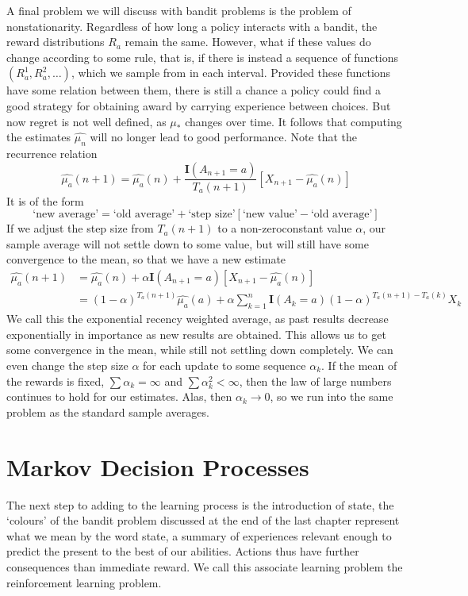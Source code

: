 A final problem we will discuss with bandit problems is the problem of nonstationarity. Regardless of how long a policy interacts with a bandit, the reward distributions $R_a$ remain the same. However, what if these values do change according to some rule, that is, if there is instead a sequence of functions $(R^1_a, R^2_a, \dots)$, which we sample from in each interval. Provided these functions have some relation between them, there is still a chance a policy could find a good strategy for obtaining award by carrying experience between choices. But now regret is not well defined, as $\mu_*$ changes over time. It follows that computing the estimates $\widehat{\mu_n}$ will no longer lead to good performance. Note that the recurrence relation
%
\[ \widehat{\mu_a}(n+1) = \widehat{\mu_a}(n) + \frac{\mathbf{I}(A_{n+1} = a)}{T_a(n+1)} [X_{n+1} - \widehat{\mu_a}(n)] \]
%
It is of the form
%
\[ \text{`new average'} = \text{`old average'} + \text{`step size'}[\text{`new value'} - \text{`old average'}] \]
%
If we adjust the step size from $T_a(n+1)$ to a non-zeroconstant value $\alpha$, our sample average will not settle down to some value, but will still have some convergence to the mean, so that we have a new estimate
%
\begin{align*}
    \widehat{\mu_a}(n+1) &= \widehat{\mu_a}(n) + \alpha \mathbf{I}(A_{n+1} = a) [X_{n+1} - \widehat{\mu_a}(n)]\\
    &= (1 - \alpha)^{T_a(n+1)} \widehat{\mu_a}(a) + \alpha \sum_{k = 1}^n \mathbf{I}(A_k = a) (1 - \alpha)^{T_a(n+1) - T_a(k)} X_k
\end{align*}
%
We call this the exponential recency weighted average, as past results decrease exponentially in importance as new results are obtained. This allows us to get some convergence in the mean, while still not settling down completely. We can even change the step size $\alpha$ for each update to some sequence $\alpha_k$. If the mean of the rewards is fixed, $\sum \alpha_k = \infty$ and $\sum \alpha_k^2 < \infty$, then the law of large numbers continues to hold for our estimates. Alas, then $\alpha_k \to 0$, so we run into the same problem as the standard sample averages.

\chapter{Markov Decision Processes}

The next step to adding to the learning process is the introduction of state, the `colours' of the bandit problem discussed at the end of the last chapter represent what we mean by the word state, a summary of experiences relevant enough to predict the present to the best of our abilities. Actions thus have further consequences than immediate reward. We call this associate learning problem the reinforcement learning problem.

